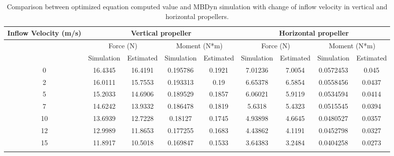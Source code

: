 \begin{table}
\centering
\caption{Comparison between optimized equation computed value and MBDyn simulation with change of inflow velocity in vertical and horizontal propellers.}
\begin{tabular}{c|cc|cc|cc|cc}
\hline
Inflow Velocity (m/s) & \multicolumn{4}{c}{Vertical propeller} & \multicolumn{4}{c}{Horizontal propeller} \\
\hline
       & \multicolumn{2}{c}{Force (N)}  & \multicolumn{2}{c}{Moment (N*m)} & \multicolumn{2}{c}{Force (N)}  & \multicolumn{2}{c}{Moment (N*m)}\\
       \hline
       & Simulation & Estimated & Simulation & Estimated & Simulation & Estimated & Simulation & Estimated \\
       \hline
0      & 16.4345 & 16.4191 & 0.195786 & 0.1921 & 7.01236 & 7.0054 & 0.0572453 & 0.045 \\
2      & 16.0111 & 15.7553 & 0.193313 & 0.19   & 6.65378 & 6.5854 & 0.0558456 & 0.0437 \\
5      & 15.2033 & 14.6906 & 0.189529 & 0.1857 & 6.06021 & 5.9119 & 0.0534594 & 0.0414 \\
7      & 14.6242 & 13.9332 & 0.186478 & 0.1819 & 5.6318  & 5.4323 & 0.0515545 & 0.0394 \\
10     & 13.6939 & 12.7228 & 0.18127  & 0.1745 & 4.93898 & 4.6645 & 0.0480527 & 0.0357 \\
12     & 12.9989 & 11.8653 & 0.177255 & 0.1683 & 4.43862 & 4.1191 & 0.0452798 & 0.0327 \\
15     & 11.8917 & 10.5018 & 0.169847 & 0.1533 & 3.64383 & 3.2484 & 0.0404258 & 0.0273 \\
\hline
\label{tab:aero_rotor wind}
\end{tabular}
\end{table}

